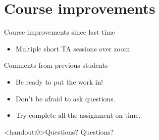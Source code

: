 \documentclass[10pt]{beamer}
\begin{document}
\section{Course improvements}
\frame{\sectionpage}

\begin{frame}{Course improvements since last time}

\begin{itemize}
\item Multiple short TA sessions over zoom
\end{itemize}

\end{frame}


\frame{\sectionpage}

\begin{frame}{Comments from previous students}

\begin{itemize}
\item Be ready to put the work in!
\item Don’t be afraid to ask questions.
\item Try complete all the assignment on time.
\end{itemize}

\end{frame}


\begin{frame}<handout:0>{Questions?}
Questions?
\end{frame}

\end{document}
